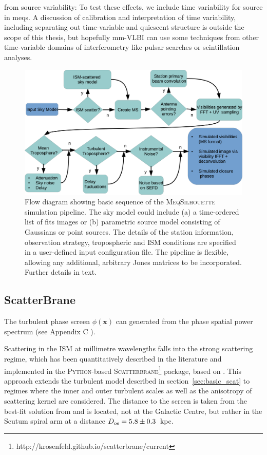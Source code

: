 from source variability: To test these effects, we include time variability for source in meqs. A discussion of calibration and interpretation of time variability, including separating out time-variable and quiescent structure is outside the scope of this thesis, but hopefully mm-VLBI can use some techniques from other time-variable domains of interferometry like pulsar searches or scintillation analyses.

\begin{figure}
\begin{center}
\includegraphics[width=\columnwidth]{Images/flow_full}
\caption{Flow diagram showing basic sequence of the \textsc{MeqSilhouette} simulation pipeline. The sky model could include (a) a time-ordered list of {\sc fits} images or (b) parametric source model consisting of Gaussians or point sources. The details of the station information, observation strategy, tropospheric and ISM conditions are specified in a user-defined input configuration file. The pipeline is flexible, allowing any additional, arbitrary Jones matrices to be incorporated. Further details in text.\label{flow}%
}
\end{center}
\end{figure}


\subsection{ScatterBrane}
The turbulent phase screen $\phi(\mathbf{x})$ can generated from the phase spatial power spectrum (see Appendix C \citet*{Johnson_2015a}). 

Scattering in the ISM at millimetre wavelengths falls into the strong scattering regime, which has been quantitatively described in the literature \citep*{Narayan_1989,Goodman_1989} and implemented in the \textsc{Python}-based \textsc{Scatterbrane}\footnote{http://krosenfeld.github.io/scatterbrane/current} package, based on \citet*{Johnson_2015a}. This approach extends the turbulent model described in section~\ref{sec:basic_scat} to regimes where the inner and outer turbulent scales as well as the anisotropy of scattering kernel are considered. The distance to the screen is taken from the best-fit solution from \citet{Bower_2013} and is located, not at the Galactic Centre, but rather in the Scutum spiral arm at a distance $D_{\rm os}=5.8 \pm 0.3$~kpc. 


